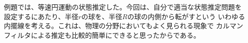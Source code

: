 例題では、等速円運動の状態推定した。今回は、自分で適当な状態推定問題を
設定するにあたり、半径$r$の球を、半径$R$の球の内側から転がすという
いわゆる内擺線を考える。これは、物理の分野においてもよく見られる現象で
カルマンフィルタによる推定も比較的簡単にできると思ったからである。
